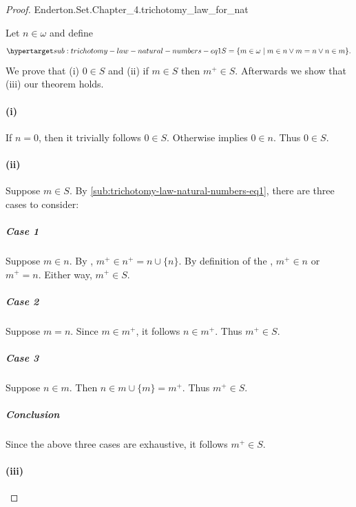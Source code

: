 \documentclass{report}
\begin{document}
\begin{proof}

    {Enderton.Set.Chapter\_4.trichotomy\_law\_for\_nat}

  Let $n \in \omega$ and define
    \begin{equation}
      \hyperlabel{sub:trichotomy-law-natural-numbers-eq1}
      S = \{m \in \omega \mid m \in n \lor m = n \lor n \in m\}.
    \end{equation}
  We prove that (i) $0 \in S$ and (ii) if $m \in S$ then $m^+ \in S$.
  Afterwards we show that (iii) our theorem holds.

  \paragraph{(i)}%

    If $n = 0$, then it trivially follows $0 \in S$.
    Otherwise  implies $0 \in n$.
    Thus $0 \in S$.

  \paragraph{(ii)}%

    Suppose $m \in S$.
    By \eqref{sub:trichotomy-law-natural-numbers-eq1}, there are three cases to
      consider:

    \subparagraph{Case 1}%

      Suppose $m \in n$.
      By , $m^+ \in n^+ = n \cup \{n\}$.
      By definition of the , $m^+ \in n$ or $m^+ = n$.
      Either way, $m^+ \in S$.

    \subparagraph{Case 2}%

      Suppose $m = n$.
      Since $m \in m^+$, it follows $n \in m^+$.
      Thus $m^+ \in S$.

    \subparagraph{Case 3}%

      Suppose $n \in m$.
      Then $n \in m \cup \{m\} = m^+$.
      Thus $m^+ \in S$.

    \subparagraph{Conclusion}%

      Since the above three cases are exhaustive, it follows $m^+ \in S$.

  \paragraph{(iii)}%


\end{proof}
\end{document}
